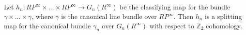 Let $h_n: RP^\infty \times \dots \times RP^\infty \rightarrow G_n(R^\infty)$ be the classifying map for the bundle $\gamma \times \dots \times \gamma$, where $\gamma$ is the canonical line bundle over $RP^\infty$. Then $h_n$ is a splitting map for the canonical bundle $\gamma_n$ over $G_n(R^\infty)$ with respect to $\mathbb{Z}_2$ cohomology.
